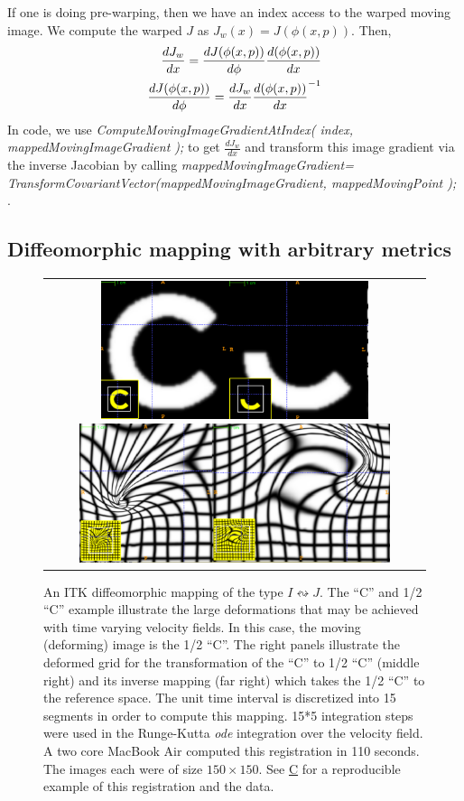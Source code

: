 \documentclass{frontiersSCNS}
\begin{document}
 If one is doing pre-warping, then we have an index access to the
 warped moving image.  We compute the warped $J$ as
 $J_w(x)=J(\phi(x,p))$.  Then,
\begin{eqnarray}
\frac{dJ_w}{dx}=\frac{dJ(\phi(x,p))}{d\phi}\frac{d(\phi(x,p))}{dx} \\ \notag
\frac{dJ(\phi(x,p))}{d\phi}=\frac{dJ_w}{dx}{\frac{d(\phi(x,p))}{dx}}^{-1} 
\end{eqnarray}
In code, we use {\em ComputeMovingImageGradientAtIndex( index,
mappedMovingImageGradient );} to get $\frac{dJ_w}{dx}$ and transform
this image gradient via the inverse Jacobian by calling 
{\em mappedMovingImageGradient=
TransformCovariantVector(mappedMovingImageGradient, mappedMovingPoint ); }.


\subsection{Diffeomorphic mapping with arbitrary metrics}
\begin{figure}[t]
\begin{center}
\begin{tabular}{c}
\includegraphics[height=1.6in]{figs/c_chalf.pdf}
\includegraphics[height=1.6in]{figs/c_half_c_grids.pdf}
\end{tabular}
\caption{\baselineskip 12pt \small An ITK diffeomorphic mapping of the
  type $I \leftrightsquigarrow J $.  The 
``C'' and 1/2 ``C'' example illustrate the large deformations that may
be achieved with time varying velocity fields.  In this case, the moving (deforming) image is
the 1/2 ``C''.  The right panels illustrate the deformed grid for the
transformation of the ``C'' to 1/2 ``C'' (middle right) and its
inverse mapping (far right) which takes the 1/2 ``C'' to the reference
space.  The unit time interval is discretized into 15 segments in
order to compute this mapping.  15*5 integration steps were used in
the Runge-Kutta {\em ode} integration over the velocity field.  A two
core MacBook Air computed this registration in 110 seconds.  The images
each were of size $150 \times 150$.  See
\href{http://stnava.github.io/C/}{C} for a reproducible example of
this registration and the data.}
\label{fig:chalf}
\end{center}
\end{figure}
\end{document}
